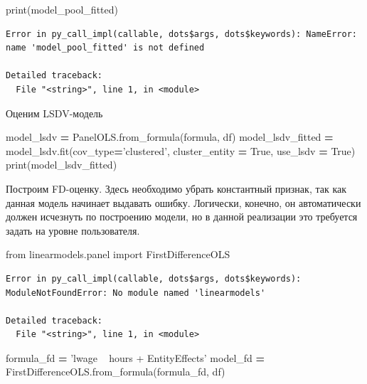 \documentclass[]{book}
\newenvironment{Shaded}{\begin{snugshade}}{\end{snugshade}}
\newcommand{\BuiltInTok}[1]{#1}
\newcommand{\ImportTok}[1]{#1}
\newcommand{\NormalTok}[1]{#1}
\newcommand{\OperatorTok}[1]{\textcolor[rgb]{0.81,0.36,0.00}{\textbf{#1}}}
\newcommand{\StringTok}[1]{\textcolor[rgb]{0.31,0.60,0.02}{#1}}
\newcommand{\VariableTok}[1]{\textcolor[rgb]{0.00,0.00,0.00}{#1}}
\begin{document}
\begin{Shaded}
\begin{Highlighting}[]
\BuiltInTok{print}\NormalTok{(model_pool_fitted)}
\end{Highlighting}
\end{Shaded}

\begin{verbatim}
Error in py_call_impl(callable, dots$args, dots$keywords): NameError: name 'model_pool_fitted' is not defined

Detailed traceback: 
  File "<string>", line 1, in <module>
\end{verbatim}

Оценим LSDV-модель

\begin{Shaded}
\begin{Highlighting}[]
\NormalTok{model_lsdv }\OperatorTok{=}\NormalTok{ PanelOLS.from_formula(formula, df)}
\NormalTok{model_lsdv_fitted }\OperatorTok{=}\NormalTok{ model_lsdv.fit(cov_type}\OperatorTok{=}\StringTok{'clustered'}\NormalTok{, cluster_entity }\OperatorTok{=} \VariableTok{True}\NormalTok{, use_lsdv }\OperatorTok{=} \VariableTok{True}\NormalTok{)}
\BuiltInTok{print}\NormalTok{(model_lsdv_fitted)}
\end{Highlighting}
\end{Shaded}

Построим FD-оценку. Здесь необходимо убрать константный признак, так как данная модель начинает выдавать ошибку. Логически, конечно, он автоматически должен исчезнуть по построению модели, но в данной реализации это требуется задать на уровне пользователя.

\begin{Shaded}
\begin{Highlighting}[]
\ImportTok{from}\NormalTok{ linearmodels.panel }\ImportTok{import}\NormalTok{ FirstDifferenceOLS}
\end{Highlighting}
\end{Shaded}

\begin{verbatim}
Error in py_call_impl(callable, dots$args, dots$keywords): ModuleNotFoundError: No module named 'linearmodels'

Detailed traceback: 
  File "<string>", line 1, in <module>
\end{verbatim}

\begin{Shaded}
\begin{Highlighting}[]
\NormalTok{formula_fd }\OperatorTok{=} \StringTok{'lwage ~ hours + EntityEffects'}
\NormalTok{model_fd }\OperatorTok{=}\NormalTok{ FirstDifferenceOLS.from_formula(formula_fd, df)}
\end{Highlighting}
\end{Shaded}
\end{document}
